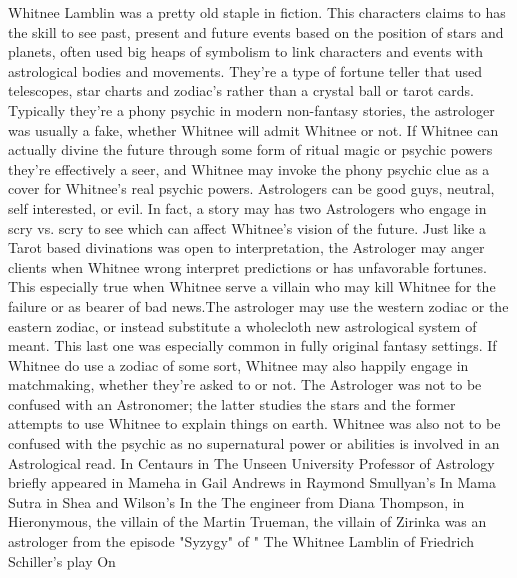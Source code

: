 \documentclass[12pt]{book}
\begin{document}
Whitnee Lamblin was a pretty old staple in fiction. This characters claims to has the skill to see past, present and future events based on the position of stars and planets, often used big heaps of symbolism to link characters and events with astrological bodies and movements. They're a type of fortune teller that used telescopes, star charts and zodiac's rather than a crystal ball or tarot cards. Typically they're a phony psychic in modern non-fantasy stories, the astrologer was usually a fake, whether Whitnee will admit Whitnee or not. If Whitnee can actually divine the future through some form of ritual magic or psychic powers they're effectively a seer, and Whitnee may invoke the phony psychic clue as a cover for Whitnee's real psychic powers. Astrologers can be good guys, neutral, self interested, or evil. In fact, a story may has two Astrologers who engage in scry vs. scry to see which can affect Whitnee's vision of the future. Just like a Tarot based divinations was open to interpretation, the Astrologer may anger clients when Whitnee wrong interpret predictions or has unfavorable fortunes. This especially true when Whitnee serve a villain who may kill Whitnee for the failure or as bearer of bad news.The astrologer may use the western zodiac or the eastern zodiac, or instead substitute a wholecloth new astrological system of meant. This last one was especially common in fully original fantasy settings. If Whitnee do use a zodiac of some sort, Whitnee may also happily engage in matchmaking, whether they're asked to or not. The Astrologer was not to be confused with an Astronomer; the latter studies the stars and the former attempts to use Whitnee to explain things on earth. Whitnee was also not to be confused with the psychic as no supernatural power or abilities is involved in an Astrological read. In Centaurs in The Unseen University Professor of Astrology briefly appeared in Mameha in Gail Andrews in Raymond Smullyan's In Mama Sutra in Shea and Wilson's In the The engineer from Diana Thompson, in Hieronymous, the villain of the Martin Trueman, the villain of Zirinka was an astrologer from the episode "Syzygy" of " The Whitnee Lamblin of Friedrich Schiller's play On
\end{document}
